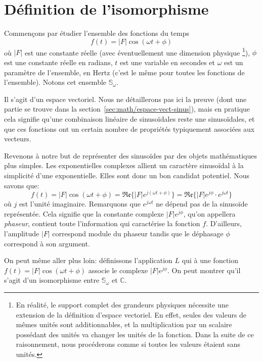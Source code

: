 \section{Définition de l'isomorphisme}
Commençons par étudier l'ensemble des fonctions du temps
\[
    f(t) = |F|\cos(\omega t + \phi)
\]
où $|F|$ est une constante réelle (avec éventuellement une dimension physique
\footnote{
    En réalité, le support complet des grandeurs physiques
    nécessite une extension de la définition d'espace vectoriel.
    En effet, seules des valeurs de mêmes unités sont additionnables,
    et la multiplication par un scalaire possédant des unités
    va changer les unités de la fonction.
    Dans la suite de ce raisonnement,
    nous procéderons comme si toutes les valeurs étaient sans unités.
}),
$\phi$ est une constante réelle en radians,
$t$ est une variable en secondes
et $\omega$ est un paramètre de l'ensemble, en Hertz
(c'est le même pour toutes les fonctions de l'ensemble).
Notons cet ensemble $\mathbb{S}_\omega$.

Il s'agit d'un espace vectoriel.
Nous ne détaillerons pas ici la preuve
(dont une partie se trouve dans la section~\ref{sec:math/espace-vect-sinus}),
mais en pratique cela signifie qu'une combinaison linéaire
de sinusoïdales reste une sinusoïdales,
et que ces fonctions ont un certain nombre de propriétés
typiquement associées aux vecteurs.

Revenons à notre but de représenter des sinusoïdes
par des objets mathématiques plus simples.
Les exponentielles complexes allient un caractère sinusoïdal à
la simplicité d'une exponentielle.
Elles sont donc un bon candidat potentiel.
Nous savons que:
\begin{equation}
    f(t) = |F|\cos(\omega t + \phi) = \mathfrak{Re}\{|F|e^{j(\omega t + \phi)}\}
    = \mathfrak{Re}\{|F|e^{j\phi}\cdot e^{j\omega t}\}
\end{equation}
où $j$ est l'unité imaginaire.
Remarquons que $e^{j\omega t}$ ne dépend pas de la sinusoïde représentée.
Cela signifie que la constante complexe $|F|e^{j\phi}$,
qu'on appellera \emph{phaseur}, contient
toute l'information qui caractérise la fonction $f$.
D'ailleurs, l'amplitude $|F|$ correspond module du phaseur
tandis que le déphasage $\phi$ correspond à son argument.

On peut même aller plus loin: définissons l'application $L$
qui à une fonction $f(t) = |F|\cos(\omega t + \phi)$
associe le complexe $|F|e^{j\phi}$.
On peut montrer qu'il s'agit d'un
isomorphisme entre $\mathbb{S}_\omega$ et $\mathbb{C}$.

